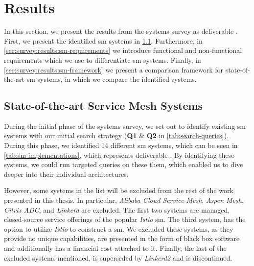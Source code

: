 \section{Results}
\label{sec:survey:results}


In this section, we present the results from the systems survey as deliverable . First, we present the identified \gls{sm} systems in \cref{sec:survey:results:sm-systems}. Furthermore, in \cref{sec:survey:results:sm-requirements} we introduce functional and non-functional requirements which we use to differentiate \gls{sm} systems. Finally, in \cref{sec:survey:results:sm-framework} we present a comparison framework for state-of-the-art \gls{sm} systems, in which we compare the identified systems.


\subsection{State-of-the-art Service Mesh Systems}
\label{sec:survey:results:sm-systems}

During the initial phase of the systems survey, we set out to identify existing \gls{sm} systems with our initial search strategy (\textbf{Q1} \& \textbf{Q2} in \cref{tab:search-queries}). During this phase, we identified 14 different \gls{sm} systems, which can be seen in \cref{tab:sm-implementations}, which represents deliverable . By identifying these systems, we could run targeted queries on these them, which enabled us to dive deeper into their individual architectures.



However, some systems in the list will be excluded from the rest of the work presented in this thesis. In particular, \textit{Alibaba Cloud Service Mesh},  \textit{Aspen Mesh}, \textit{Citrix ADC}, and \textit{Linkerd} are excluded. The first two systems are managed, closed-source service offerings of the popular \textit{Istio} \gls{sm}. The third system, has the option to utilize  \textit{Istio} to construct a \gls{sm}. We excluded these systems, as they provide no unique capabilities, are presented in the form of black box software and additionally has a financial cost attached to it. Finally, the last of the excluded systems mentioned, is superseded by \textit{Linkerd2} and is discontinued. 

